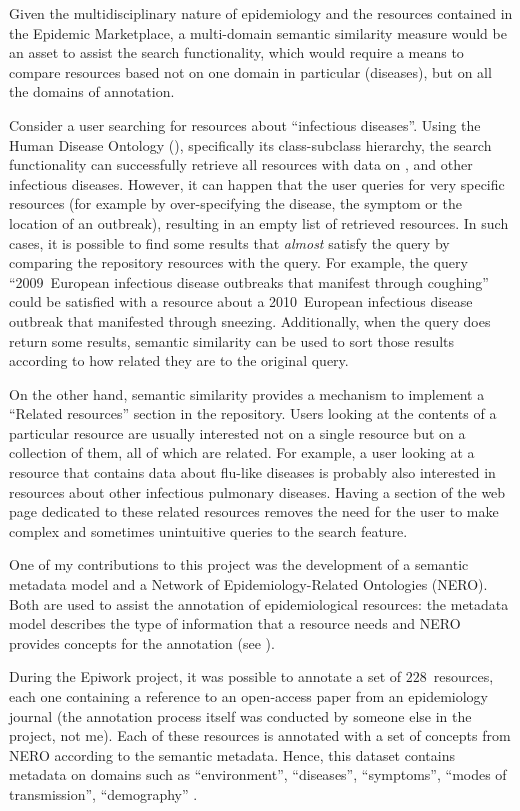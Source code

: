 Given the multidisciplinary nature of epidemiology and the resources contained in the Epidemic Marketplace, a multi-domain semantic similarity measure would be an asset to assist the search functionality, which would require a means to compare resources based not on one domain in particular (\eg diseases), but on all the domains of annotation.

Consider a user searching for resources about ``infectious diseases''. Using the Human Disease Ontology (), specifically its class-subclass hierarchy, the search functionality can successfully retrieve all resources with data on ,  and other infectious diseases. However, it can happen that the user queries for very specific resources (for example by over-specifying the disease, the symptom or the location of an outbreak), resulting in an empty list of retrieved resources. In such cases, it is possible to find some results that \emph{almost} satisfy the query by comparing the repository resources with the query. For example, the query ``2009~European infectious disease outbreaks that manifest through coughing'' could be satisfied with a resource about a 2010~European infectious disease outbreak that manifested through sneezing. Additionally, when the query does return some results, semantic similarity can be used to sort those results according to how related they are to the original query.

On the other hand, semantic similarity provides a mechanism to implement a ``Related resources'' section in the repository. Users looking at the contents of a particular resource are usually interested not on a single resource but on a collection of them, all of which are related. For example, a user looking at a resource that contains data about flu-like diseases is probably also interested in resources about other infectious pulmonary diseases. Having a section of the web page dedicated to these related resources removes the need for the user to make complex and sometimes unintuitive queries to the search feature.

One of my contributions to this project was the development of a semantic metadata model and a Network of Epidemiology-Related Ontologies (NERO). Both are used to assist the annotation of epidemiological resources: the metadata model describes the type of information that a resource needs and NERO provides concepts for the annotation (see ).

During the Epiwork project, it was possible to annotate a set of $228$~resources, each one containing a reference to an open-access paper from an epidemiology journal (the annotation process itself was conducted by someone else in the project, not me). Each of these resources is annotated with a set of concepts from NERO according to the semantic metadata. Hence, this dataset contains metadata on domains such as ``environment'', ``diseases'', ``symptoms'', ``modes of transmission'', ``demography'' \etc.

